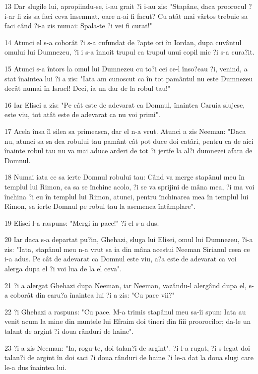 \par 13 Dar slugile lui, apropiindu-se, i-au grait ?i i-au zis: "Stapâne, daca proorocul ?i-ar fi zis sa faci ceva însemnat, oare n-ai fi facut? Cu atât mai vârtos trebuie sa faci când ?i-a zis numai: Spala-te ?i vei fi curat!"
\par 14 Atunci el s-a coborât ?i s-a cufundat de ?apte ori în Iordan, dupa cuvântul omului lui Dumnezeu, ?i i s-a înnoit trupul ca trupul unui copil mic ?i s-a cura?it.
\par 15 Atunci s-a întors la omul lui Dumnezeu cu to?i cei ce-l înso?eau ?i, venind, a stat înaintea lui ?i a zis: "Iata am cunoscut ca în tot pamântul nu este Dumnezeu decât numai în Israel! Deci, ia un dar de la robul tau!"
\par 16 Iar Elisei a zis: "Pe cât este de adevarat ca Domnul, înaintea Caruia slujesc, este viu, tot atât este de adevarat ca nu voi primi".
\par 17 Acela însa îl silea sa primeasca, dar el n-a vrut. Atunci a zis Neeman: "Daca nu, atunci sa sa dea robului tau pamânt cât pot duce doi catâri, pentru ca de aici înainte robul tau nu va mai aduce arderi de tot ?i jertfe la al?i dumnezei afara de Domnul.
\par 18 Numai iata ce sa ierte Domnul robului tau: Când va merge stapânul meu în templul lui Rimon, ca sa se închine acolo, ?i se va sprijini de mâna mea, ?i ma voi închina ?i eu în templul lui Rimon, atunci, pentru închinarea mea în templul lui Rimon, sa ierte Domnul pe robul tau la asemenea întâmplare".
\par 19 Elisei l-a raspuns: "Mergi în pace!" ?i el s-a dus.
\par 20 Iar daca s-a departat pu?in, Ghehazi, sluga lui Elisei, omul lui Dumnezeu, ?i-a zis: "Iata, stapânul meu n-a vrut sa ia din mâna acestui Neeman Sirianul ceea ce i-a adus. Pe cât de adevarat ca Domnul este viu, a?a este de adevarat ca voi alerga dupa el ?i voi lua de la el ceva".
\par 21 ?i a alergat Ghehazi dupa Neeman, iar Neeman, vazându-l alergând dupa el, s-a coborât din caru?a înaintea lui ?i a zis: "Cu pace vii?"
\par 22 ?i Ghehazi a raspuns: "Cu pace. M-a trimis stapânul meu sa-îi spun: Iata au venit acum la mine din muntele lui Efraim doi tineri din fiii proorocilor; da-le un talant de argint ?i doua rânduri de haine".
\par 23 ?i a zis Neeman: "Ia, rogu-te, doi talan?i de argint". ?i l-a rugat, ?i s legat doi talan?i de argint în doi saci ?i doua rânduri de haine ?i le-a dat la doua slugi care le-a dus înaintea lui.
